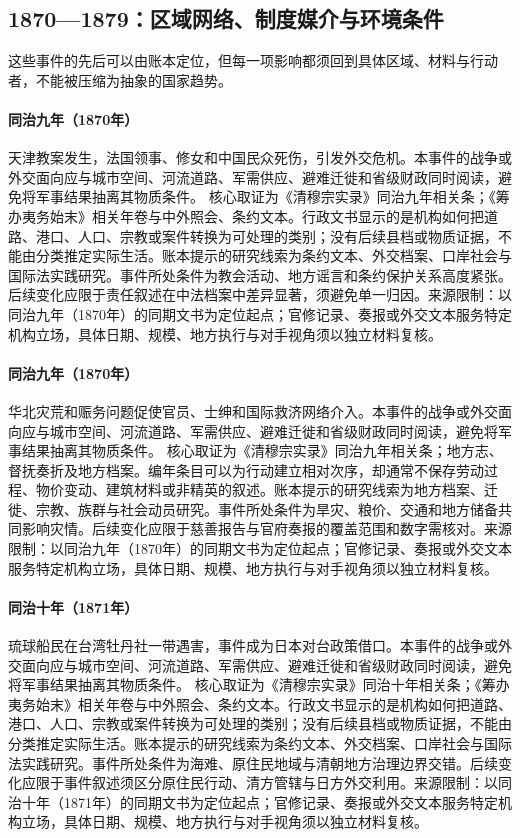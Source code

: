 \subsection{1870—1879：区域网络、制度媒介与环境条件}
这些事件的先后可以由账本定位，但每一项影响都须回到具体区域、材料与行动者，不能被压缩为抽象的国家趋势。
\hypertarget{civic:EQ-1870-TIANJIN-MASSACRE}{}\paragraph{同治九年（1870年）}天津教案发生，法国领事、修女和中国民众死伤，引发外交危机。本事件的战争或外交面向应与城市空间、河流道路、军需供应、避难迁徙和省级财政同时阅读，避免将军事结果抽离其物质条件。 核心取证为《清穆宗实录》同治九年相关条；《筹办夷务始末》相关年卷与中外照会、条约文本。行政文书显示的是机构如何把道路、港口、人口、宗教或案件转换为可处理的类别；没有后续县档或物质证据，不能由分类推定实际生活。账本提示的研究线索为条约文本、外交档案、口岸社会与国际法实践研究。事件所处条件为教会活动、地方谣言和条约保护关系高度紧张。后续变化应限于责任叙述在中法档案中差异显著，须避免单一归因。来源限制：以同治九年（1870年）的同期文书为定位起点；官修记录、奏报或外交文本服务特定机构立场，具体日期、规模、地方执行与对手视角须以独立材料复核。
\hypertarget{civic:EQ-1870-ZHILI-FAMINE-RELIEF}{}\paragraph{同治九年（1870年）}华北灾荒和赈务问题促使官员、士绅和国际救济网络介入。本事件的战争或外交面向应与城市空间、河流道路、军需供应、避难迁徙和省级财政同时阅读，避免将军事结果抽离其物质条件。 核心取证为《清穆宗实录》同治九年相关条；地方志、督抚奏折及地方档案。编年条目可以为行动建立相对次序，却通常不保存劳动过程、物价变动、建筑材料或非精英的叙述。账本提示的研究线索为地方档案、迁徙、宗教、族群与社会动员研究。事件所处条件为旱灾、粮价、交通和地方储备共同影响灾情。后续变化应限于慈善报告与官府奏报的覆盖范围和数字需核对。来源限制：以同治九年（1870年）的同期文书为定位起点；官修记录、奏报或外交文本服务特定机构立场，具体日期、规模、地方执行与对手视角须以独立材料复核。
\hypertarget{civic:EQ-1871-MUDAN-INCIDENT}{}\paragraph{同治十年（1871年）}琉球船民在台湾牡丹社一带遇害，事件成为日本对台政策借口。本事件的战争或外交面向应与城市空间、河流道路、军需供应、避难迁徙和省级财政同时阅读，避免将军事结果抽离其物质条件。 核心取证为《清穆宗实录》同治十年相关条；《筹办夷务始末》相关年卷与中外照会、条约文本。行政文书显示的是机构如何把道路、港口、人口、宗教或案件转换为可处理的类别；没有后续县档或物质证据，不能由分类推定实际生活。账本提示的研究线索为条约文本、外交档案、口岸社会与国际法实践研究。事件所处条件为海难、原住民地域与清朝地方治理边界交错。后续变化应限于事件叙述须区分原住民行动、清方管辖与日方外交利用。来源限制：以同治十年（1871年）的同期文书为定位起点；官修记录、奏报或外交文本服务特定机构立场，具体日期、规模、地方执行与对手视角须以独立材料复核。
